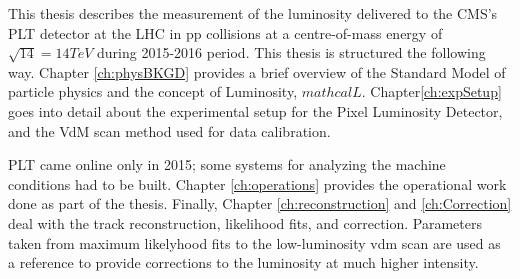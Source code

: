 This thesis describes the measurement of the luminosity delivered to the CMS's PLT detector at the LHC in pp collisions at a centre-of-mass energy of $\sqrt{14}= 14 TeV$ during 2015-2016 period. This thesis is structured the following way. Chapter \ref{ch:physBKGD} provides a brief overview of the Standard Model of particle physics and the concept of Luminosity, $mathcal{L}$. Chapter\ref{ch:expSetup} goes into detail about the experimental setup for the Pixel Luminosity Detector, and the VdM scan method used for data calibration. 

PLT came online only in 2015; some systems for analyzing the machine conditions had to be built. Chapter \ref{ch:operations} provides the operational work done as part of the thesis. Finally, Chapter \ref{ch:reconstruction} and \ref{ch:Correction} deal with the track reconstruction, likelihood fits, and correction. Parameters taken from maximum likelyhood fits to the low-luminosity vdm scan are used as a reference to provide corrections to the luminosity at much higher intensity.

